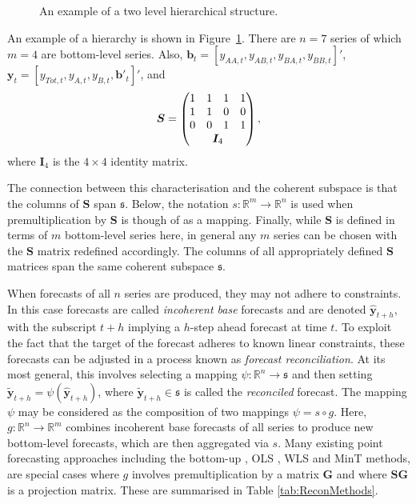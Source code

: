 \documentclass[12pt]{article}
\theoremstyle{definition}
\begin{document}
\begin{figure}[H]
	\begin{center}
		 
		 
		\qobitree
	\end{center}
	\caption{An example of a two level hierarchical structure.}\label{fig:twoL-hier}
\end{figure}
An example of a hierarchy is shown in Figure~\ref{fig:twoL-hier}. There are $n=7$ series of which $m=4$ are bottom-level series. Also, $\bm{b}_t = [y_{AA,t}, y_{AB,t}, y_{BA,t}, y_{BB,t}]'$, $\bm{y}_t = [y_{Tot,t},y_{A,t}, y_{B,t},\bm{b}'_t]'$,  and
\[
\bm{S} = \begin{pmatrix}
1 & 1 & 1 & 1 \\
1 & 1 & 0 & 0 \\
0 & 0 & 1 & 1 \\
& \multicolumn{2}{c}{\bm{I}_4} &
\end{pmatrix},
\]
where $\bm{I}_4$ is the $4\times 4$ identity matrix.

The connection between this characterisation and the coherent subspace is that the columns of $\bm{S}$ span $\mathfrak{s}$.  Below, the notation $s:\mathbb{R}^m\rightarrow\mathbb{R}^n$ is used when premultiplication by $\bm{S}$ is though of as a mapping.  Finally, while $\bm{S}$ is defined in terms of $m$ bottom-level series here, in general any $m$ series can be chosen with the $\bm{S}$ matrix redefined accordingly.  The columns of all appropriately defined $\bm{S}$ matrices span the same coherent subspace $\mathfrak{s}$.

When forecasts of all $n$ series are produced, they may not adhere to constraints.  In this case forecasts are called {\em incoherent base} forecasts and are denoted $\hat{\bm y}_{t+h}$, with the subscript $t+h$ implying a $h$-step ahead forecast at time $t$.  To exploit the fact that the target of the forecast adheres to known linear constraints, these forecasts can be adjusted in a process known as {\em forecast reconciliation}.  At its most general, this involves selecting a mapping $\psi:\mathbb{R}^n\rightarrow\mathfrak{s}$ and then setting $\tilde{\bm y}_{t+h}=\psi(\hat{\bm y}_{t+h})$, where $\tilde{\bm y}_{t+h}\in\mathfrak{s}$ is called the {\em reconciled} forecast.  The mapping $\psi$ may be considered as the composition of two mappings $\psi=s\circ g$. Here, $g:\mathbb{R}^{n}\rightarrow\mathbb{R}^{m}$ combines incoherent base forecasts of all series to produce new bottom-level forecasts, which are then aggregated via $s$.  Many existing point forecasting approaches including the bottom-up \citep{Dunn1976}, OLS \citep{HynEtAl2011}, WLS \citep[][]{Hyndman2016,AthEtAl2017} and MinT \citep{WicEtAl2019} methods, are special cases where $g$ involves premultiplication by a matrix $\bm{G}$ and where $\bm{S}\bm{G}$ is a projection matrix. These are summarised in Table \ref{tab:ReconMethods}.
\end{document}
